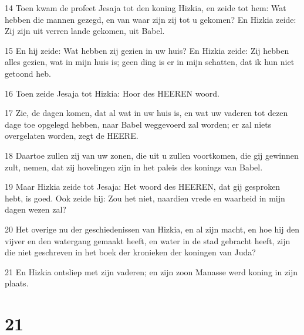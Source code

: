 \par 14 Toen kwam de profeet Jesaja tot den koning Hizkia, en zeide tot hem: Wat hebben die mannen gezegd, en van waar zijn zij tot u gekomen? En Hizkia zeide: Zij zijn uit verren lande gekomen, uit Babel.
\par 15 En hij zeide: Wat hebben zij gezien in uw huis? En Hizkia zeide: Zij hebben alles gezien, wat in mijn huis is; geen ding is er in mijn schatten, dat ik hun niet getoond heb.
\par 16 Toen zeide Jesaja tot Hizkia: Hoor des HEEREN woord.
\par 17 Zie, de dagen komen, dat al wat in uw huis is, en wat uw vaderen tot dezen dage toe opgelegd hebben, naar Babel weggevoerd zal worden; er zal niets overgelaten worden, zegt de HEERE.
\par 18 Daartoe zullen zij van uw zonen, die uit u zullen voortkomen, die gij gewinnen zult, nemen, dat zij hovelingen zijn in het paleis des konings van Babel.
\par 19 Maar Hizkia zeide tot Jesaja: Het woord des HEEREN, dat gij gesproken hebt, is goed. Ook zeide hij: Zou het niet, naardien vrede en waarheid in mijn dagen wezen zal?
\par 20 Het overige nu der geschiedenissen van Hizkia, en al zijn macht, en hoe hij den vijver en den watergang gemaakt heeft, en water in de stad gebracht heeft, zijn die niet geschreven in het boek der kronieken der koningen van Juda?
\par 21 En Hizkia ontsliep met zijn vaderen; en zijn zoon Manasse werd koning in zijn plaats.

\chapter{21}

